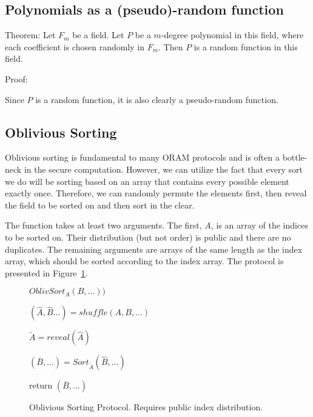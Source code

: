 \subsection{Polynomials as a (pseudo)-random function}


Theorem:
Let $F_m$ be a field. 
Let $P$ be a $m$-degree polynomial in this field, 
where each coefficient is chosen randomly in $F_m$.
Then $P$ is a random function in this field.

Proof:

Since $P$ is a random function, it is also clearly a pseudo-random function.

\subsection{Oblivious Sorting}

Oblivious sorting is fundamental to many ORAM protocols and is often
a bottle-neck in the secure computation.
However, we can utilize the fact that every sort we do will be sorting
based on an array that contains every possible element exactly once.
Therefore, we can randomly permute the elements first,
then reveal the field to be sorted on and then sort in the clear.

The function takes at least two arguments. 
The first, $A$, is an array of the indices to be sorted on.
Their distribution (but not order) is public and there are no duplicates.
The remaining arguments are arrays of the same length as the index array,
which should be sorted according to the index array.
The protocol is presented in Figure~\ref{fig:OblivSort}.


\begin{figure}
\begin{framed}

$OblivSort_A(B, ...))$

$(\hat{A}, \hat{B} ...) = shuffle(A, B, ...)$

$\tilde{A} = reveal(\hat{A})$

$(\bar{B}, ...) = Sort_{\tilde{A}}(\hat{B}, ...)$

return $(\bar{B}, \ldots)$

\caption{Oblivious Sorting Protocol. Requires public index distribution.}
\label{fig:OblivSort}
\end{framed}
\end{figure}

